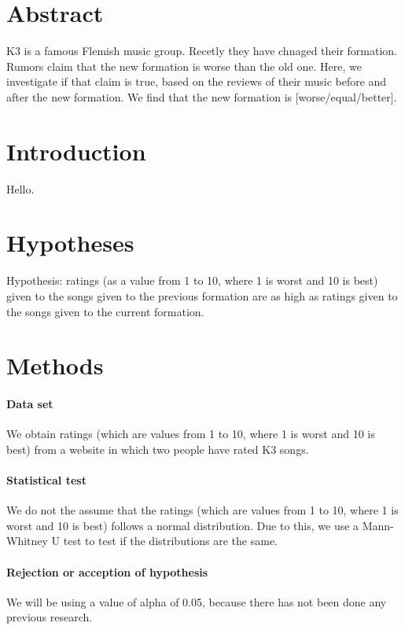\documentclass{article}
\begin{document}
\section{Abstract}

K3 is a famous Flemish music group.
Recetly they have chnaged their formation.
Rumors claim that the new formation is worse
than the old one.
Here, we investigate if that claim is true,
based on the reviews of their music before
and after the new formation.
We find that the new formation is 
[worse/equal/better].

\section{Introduction}
Hello.

\section{Hypotheses}

Hypothesis: ratings (as a value from 
1 to 10, where 1 is worst and 10 is best)
given to the songs given 
to the previous formation are as high 
as ratings given to the songs given to the
current formation.

\section{Methods}

\paragraph{Data set}
We obtain ratings (which are values from
1 to 10, where 1 is worst and 10 is best)
from a website in which two people 
have rated K3 songs.

\paragraph{Statistical test}
We do not the assume that the
ratings (which are values from 
1 to 10, where 1 is worst and 10 is best)
follows a normal distribution. Due to this,
we use a Mann-Whitney U test to test if
the distributions are the same.

\paragraph{Rejection or acception of hypothesis}
We will be using a value of alpha of 0.05,
because there has not been done any previous
research.
\end{document}
